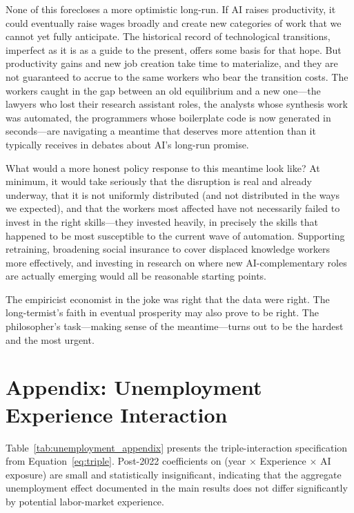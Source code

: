 \documentclass[11pt]{article}
\begin{document}
None of this forecloses a more optimistic long-run. If AI raises productivity, it could eventually raise wages broadly and create new categories of work that we cannot yet fully anticipate. The historical record of technological transitions, imperfect as it is as a guide to the present, offers some basis for that hope. But productivity gains and new job creation take time to materialize, and they are not guaranteed to accrue to the same workers who bear the transition costs. The workers caught in the gap between an old equilibrium and a new one---the lawyers who lost their research assistant roles, the analysts whose synthesis work was automated, the programmers whose boilerplate code is now generated in seconds---are navigating a meantime that deserves more attention than it typically receives in debates about AI's long-run promise.

What would a more honest policy response to this meantime look like? At minimum, it would take seriously that the disruption is real and already underway, that it is not uniformly distributed (and not distributed in the ways we expected), and that the workers most affected have not necessarily failed to invest in the right skills---they invested heavily, in precisely the skills that happened to be most susceptible to the current wave of automation. Supporting retraining, broadening social insurance to cover displaced knowledge workers more effectively, and investing in research on where new AI-complementary roles are actually emerging would all be reasonable starting points.

The empiricist economist in the joke was right that the data were right. The long-termist's faith in eventual prosperity may also prove to be right. The philosopher's task---making sense of the meantime---turns out to be the hardest and the most urgent.

\printbibliography

\appendix
\section{Appendix: Unemployment Experience Interaction}

Table~\ref{tab:unemployment_appendix} presents the triple-interaction specification from Equation~\eqref{eq:triple}. Post-2022 coefficients on (year $\times$ Experience $\times$ AI exposure) are small and statistically insignificant, indicating that the aggregate unemployment effect documented in the main results does not differ significantly by potential labor-market experience.
\end{document}
